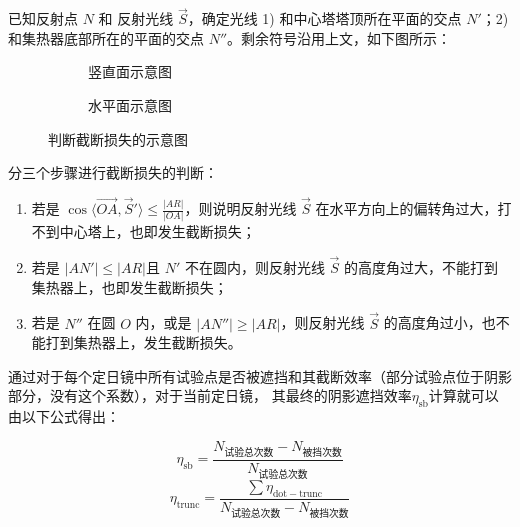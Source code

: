 \documentclass[../main.tex]{subfiles}
\begin{document}
已知反射点 \(N\) 和 反射光线 \(\vec S\)，确定光线 1) 和中心塔塔顶所在平面的交点 \(N'\)；2) 和集热器底部所在的平面的交点 \(N''\)。剩余符号沿用上文，如下图所示：

\begin{figure}[H]
\centering
\begin{subfigure}[b]{0.4\textwidth}
\centering

\caption{\kaishu 竖直面示意图}
\end{subfigure}
\begin{subfigure}[b]{0.4\textwidth}
\centering

\caption{\kaishu 水平面示意图}
\end{subfigure}
\caption{\kaishu 判断截断损失的示意图}
\end{figure}

分三个步骤进行截断损失的判断：
\begin{enumerate}
\item 若是 \( \displaystyle\cos \langle \overrightarrow{OA}, \vec S' \rangle\le \frac{\vert AR \vert}{\vert OA \vert}\)，则说明反射光线 \(\vec S\) 在水平方向上的偏转角过大，打不到中心塔上，也即发生截断损失；
\item 若是 \(\vert AN'\vert \le \vert AR \vert\)且 \(N'\) 不在圆内，则反射光线 \(\vec S\) 的高度角过大，不能打到集热器上，也即发生截断损失；
\item 若是 \(N''\) 在圆 \(O\) 内，或是 \(\vert AN'' \vert \ge \vert AR \vert\)，则反射光线 \(\vec S\) 的高度角过小，也不能打到集热器上，发生截断损失。
\end{enumerate}
通过对于每个定日镜中所有试验点是否被遮挡和其截断效率（部分试验点位于阴影部分，没有这个系数），对于当前定日镜，
其最终的阴影遮挡效率\(\eta _{\mathrm{s b}}\)计算就可以由以下公式得出：

\begin{equation}
\eta _{\mathrm{s b}} = \frac{N_{\text{试验总次数}}- N_{\text{被挡次数}}}{N_{\text{试验总次数}}}
\end{equation}
\begin{equation}
\eta _{\mathrm{trunc}} =\frac{\sum\eta _{\mathrm{dot}{-}\mathrm{trunc}}}{N_{\text{试验总次数}}- N_{\text{被挡次数}}}
\end{equation}

\end{document}
